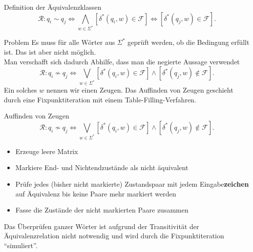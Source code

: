 \documentclass[]{beamer}
\begin{document}
\begin{frame}[squeeze]{}
  \begin{block}{Definition der Äquivalenzklassen}
    \[\mathcal{R} : q_i \sim q_j \Leftrightarrow \underset{w \in \Sigma^*}{\bigwedge} \left[ \delta^* \left( q_i, w \right) \in \mathcal{F} \right] \Leftrightarrow \left[ \delta^* \left( q_j, w \right) \in \mathcal{F} \right].\]
  \end{block}
  
  \pause
  
  \begin{alertblock}{Problem}
    Es muss für alle Wörter aus $\Sigma^*$ geprüft werden, ob die Bedingung erfüllt ist. Das ist aber nicht möglich. \\
    \pause
    \vspace*{0.5em}
    Man verschafft sich dadurch Abhilfe, dass man die negierte Aussage verwendet
    \[\mathcal{R} : q_i \nsim q_j \Leftrightarrow \underset{w \in \Sigma^*}{\bigvee} \left[ \delta^* \left( q_i, w \right) \in \mathcal{F} \right] \wedge \left[ \delta^* \left( q_j, w \right) \notin \mathcal{F} \right].\]
    Ein solches $w$ nennen wir einen Zeugen. Das Auffinden von Zeugen geschieht durch eine Fixpunktiteration mit einem Table-Filling-Verfahren.
  \end{alertblock}
\end{frame}

\begin{frame}[squeeze]{}
  \begin{block}{Auffinden von Zeugen}
    \[\mathcal{R} : q_i \nsim q_j \Leftrightarrow \underset{w \in \Sigma^*}{\bigvee} \left[ \delta^* \left( q_i, w \right) \in \mathcal{F} \right] \wedge \left[ \delta^* \left( q_j, w \right) \notin \mathcal{F} \right].\]

    \begin{itemize}
      \item Erzeuge leere Matrix
      \item Markiere End- und Nichtendzustände als nicht äquivalent
      \item Prüfe jedes (bisher nicht markierte) Zustandspaar mit jedem Eingabe\textbf{zeichen} auf Äquivalenz bis keine Paare mehr markiert werden
      \item Fasse die Zustände der nicht markierten Paare zusammen
    \end{itemize}
    
    Das Überprüfen ganzer Wörter ist aufgrund der Transitivität der Äquivalenzrelation nicht notwendig und wird durch die Fixpunktiteration \enquote{simuliert}.
  \end{block}
\end{frame}
\end{document}
